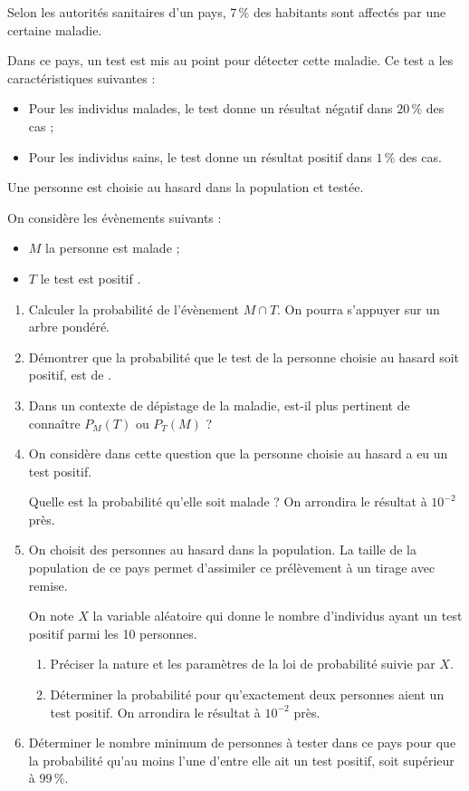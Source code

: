 \medskip


Selon les autorités sanitaires d'un pays, 7\,\% des habitants sont affectés par une certaine maladie.

Dans ce pays, un test est mis au point pour détecter cette maladie. Ce test a les caractéristiques suivantes :
\setlength\parindent{1cm}
\begin{itemize}
\item[$\bullet~~$] Pour les individus malades, le test donne un résultat négatif dans $20 \,\%$ des cas ;
\item[$\bullet~~$] Pour les individus sains, le test donne un résultat positif dans $1\,\%$ des cas.
\end{itemize}
\setlength\parindent{0cm}

Une personne est choisie au hasard dans la population et testée.

On considère les évènements suivants :

\setlength\parindent{1cm}
\begin{itemize}
\item[$\bullet~~$] $M$ \og la personne est malade \fg{} ;
\item[$\bullet~~$]  $T$ \og le test est positif \fg{}.
\end{itemize}
\setlength\parindent{0cm}

\medskip

\begin{enumerate}
\item Calculer la probabilité de l'évènement $M \cap T$. On pourra s'appuyer sur un arbre pondéré.
\item Démontrer que la probabilité que le test  de la personne choisie au hasard soit positif, est de .
\item Dans un contexte de dépistage de la maladie, est-il plus pertinent de connaître $P_M(T)$ ou $P_T(M)$ ?
\item On considère dans cette question que la personne choisie au hasard a eu un test positif.

Quelle est la probabilité qu'elle soit malade ? On arrondira le résultat à $10^{-2}$ près.
\item On choisit des personnes au hasard dans la population. La taille de la population de ce pays permet d'assimiler ce prélèvement à un tirage avec remise.

On note $X$ la variable aléatoire qui donne le nombre d'individus ayant un test positif parmi les 10 personnes. 
	\begin{enumerate}
		\item Préciser la nature et les paramètres de la loi de probabilité suivie par $X$.
		\item Déterminer la probabilité pour qu'exactement deux personnes aient un test positif. On arrondira le résultat à $10^{-2}$ près.
	\end{enumerate}	
\item Déterminer le nombre minimum de personnes à tester dans ce pays pour que la probabilité qu'au moins l'une d'entre elle ait un test positif, soit supérieur à $99\,\%$.
\end{enumerate}

\bigskip
